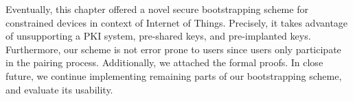 Eventually, this chapter offered a novel secure bootstrapping scheme for constrained devices in context of Internet of Things. Precisely, it takes advantage of unsupporting a PKI system, pre-shared keys, and pre-implanted keys. Furthermore, our scheme is not error prone to users since users only participate in the pairing process. Additionally, we attached the formal proofs. In close future, we continue implementing remaining parts of our bootstrapping scheme, and evaluate its usability.






